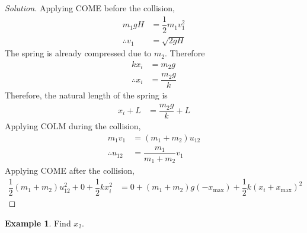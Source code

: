 \documentclass[fleqn, a4paper, 12pt]{article}
\theoremstyle{definition}
\newtheorem{example}{Example}
\theoremstyle{theorem}
\newenvironment{solution}
{\begin{proof}[Solution]\let\qed\relax}
	{\end{proof}}
\begin{document}
\begin{solution}
	Applying COME before the collision,
	\begin{align*}
		m_1 g H &= \dfrac{1}{2} m_1 v_1^2\\
		\therefore v_1 &= \sqrt{2 g H}
	\end{align*}
	The spring is already compressed due to $m_2$. Therefore
	\begin{align*}
		k x_i &= m_2 g\\
		\therefore x_i &= \dfrac{m_2 g}{k}
	\end{align*}
	Therefore, the natural length of the spring is
	\begin{align*}
		x_i + L &= \dfrac{m_2 g}{k} + L
	\end{align*}
	Applying COLM during the collision,
	\begin{align*}
		m_1 v_1 &= (m_1 + m_2) u_{12}\\
		\therefore u_{12} &= \dfrac{m_1}{m_1 + m_2} v_1
	\end{align*}
	Applying COME after the collision,
	\begin{align*}
		\dfrac{1}{2} (m_1 + m_2) u_{12}^2 + 0 + \dfrac{1}{2} k x_i^2 &= 0 + (m_1 + m_2) g (-x_{\text{max}}) + \dfrac{1}{2} k (x_i + x_{\text{max}})^2
	\end{align*}
\end{solution}

\begin{example}
	Find $x_2$.\\
\end{example}
\end{document}
